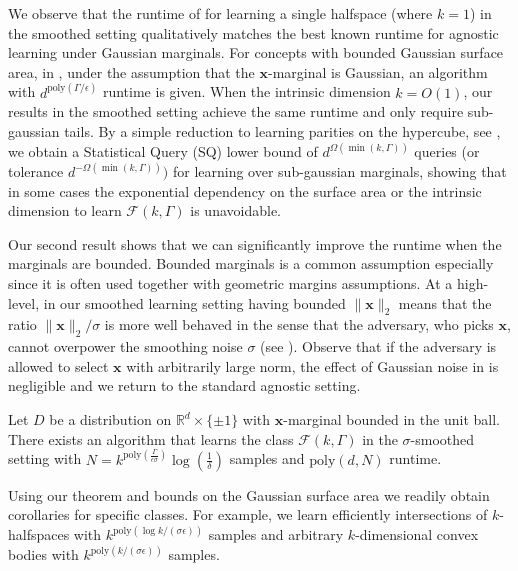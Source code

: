 \documentclass{theoretics}
\renewcommand\vec[1]{\mathbf{#1}}
\newcommand{\R}{\mathbb{R}}
\newcommand{\eps}{\epsilon}
\newcommand{\poly}{\mathrm{poly}}
\newcommand{\1}{\Ind}
\newcommand{\x}{\vec x}
\begin{document}
We observe that the runtime of  for learning a single halfspace (where $k = 1$) in the smoothed setting qualitatively matches the best known runtime for agnostic learning under Gaussian marginals.  For concepts with bounded Gaussian surface area, in \cite{KOS:08}, under the assumption that the $\x$-marginal is Gaussian, an algorithm with $d^{\poly(\Gamma/\eps)}$ runtime is given.  When the intrinsic dimension $k = O(1)$, our results in the smoothed setting achieve the same runtime and only require sub-gaussian tails.   By a simple reduction to learning parities on the hypercube, see , we obtain a Statistical Query (SQ) lower bound of 
$d^{\Omega(\min(k, \Gamma))}$ queries (or tolerance $d^{-{\Omega(\min(k, \Gamma))}})$ for learning over sub-gaussian marginals, showing that in some cases the exponential dependency on the surface area or the intrinsic dimension to learn $\mathcal{F}(k, \Gamma)$ is unavoidable.  


Our second result shows that we can significantly improve the runtime when the marginals are bounded.
Bounded marginals is a common assumption especially since it is often used together with geometric margins
assumptions.  At a high-level, in our smoothed learning setting having bounded $\|\vec x\|_2$ 
means that the ratio $\|\vec x\|_2/\sigma$ is more well behaved in the sense that the adversary, who picks $\x$, cannot overpower the smoothing noise $\sigma$ (see ). Observe that 
if the adversary is allowed to select $\x$ with arbitrarily large norm, the effect of Gaussian noise in  is negligible and we return to the standard agnostic setting.

\begin{theorem}
\label{thm:intro-bounded}
    Let $D$ be a distribution on $\R^d\times \{\pm 1\}$ with $\x$-marginal bounded in the unit ball.  There exists an algorithm that learns the class $\mathcal{F}(k, \Gamma)$ in
    the $\sigma$-smoothed setting with $N = k^{\poly(\frac{\Gamma}{\epsilon \sigma})}\log(\frac{1}{\delta})$ samples and $\poly(d,N)$ runtime.
\end{theorem}

Using our theorem and bounds on the Gaussian surface area we readily obtain corollaries for specific classes.  For example, we learn efficiently intersections of $k$-halfspaces with $k^{\poly(\log k / (\sigma \eps))}$ samples and arbitrary $k$-dimensional convex bodies  with  $k^{\poly(k/(\sigma \eps) )}$ samples.  
\end{document}
